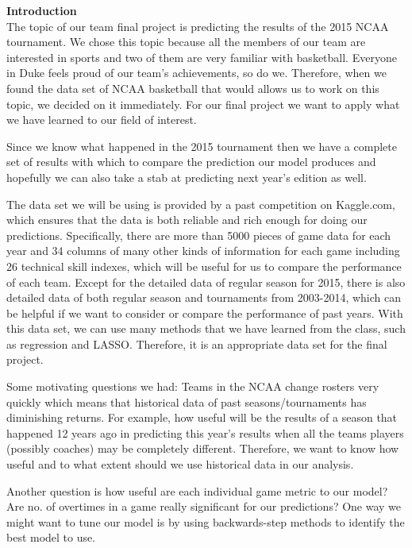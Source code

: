 \documentclass{article}
\begin{document}
\textbf{Introduction}\\
The topic of our team final project is predicting the results of the 2015 NCAA tournament. We chose this topic because all the members of our team are interested in sports and two of them are very familiar with basketball. Everyone in Duke feels proud of our team's achievements, so do we. Therefore, when we found the data set of NCAA basketball that would allows us to work on this topic, we decided on it immediately. For our final project we want to apply what we have learned to our field of interest.

Since we know what happened in the 2015 tournament then we have a complete set of results with which to compare the prediction our model produces and hopefully we can also take a stab at predicting next year's edition as well.

The data set we will be using is provided by a past competition on Kaggle.com, which ensures that the data is both reliable and rich enough for doing our predictions. Specifically, there are more than 5000 pieces of game data for each year and 34 columns of many other kinds of information for each game including 26 technical skill indexes, which will be useful for us to compare the performance of each team. Except for the detailed data of regular season for 2015, there is also detailed data of both regular season and tournaments from 2003-2014, which can be helpful if we want to consider or compare the performance of past years. With this data set, we can use many methods that we have learned from the class, such as regression and LASSO. Therefore, it is an appropriate data set for the final project.

Some motivating questions we had:
Teams in the NCAA change rosters very quickly which means that historical data of past seasons/tournaments has diminishing returns. For example, how useful will be the results of a season that happened 12 years ago in predicting this year's results when all the teams players (possibly coaches) may be completely different. Therefore, we want to know how useful and to what extent should we use historical data in our analysis.

Another question is how useful are each individual game metric to our model? Are no. of overtimes in a game really significant for our predictions? One way we might want to tune our model is by using backwards-step methods to identify the best model to use.
\end{document}
